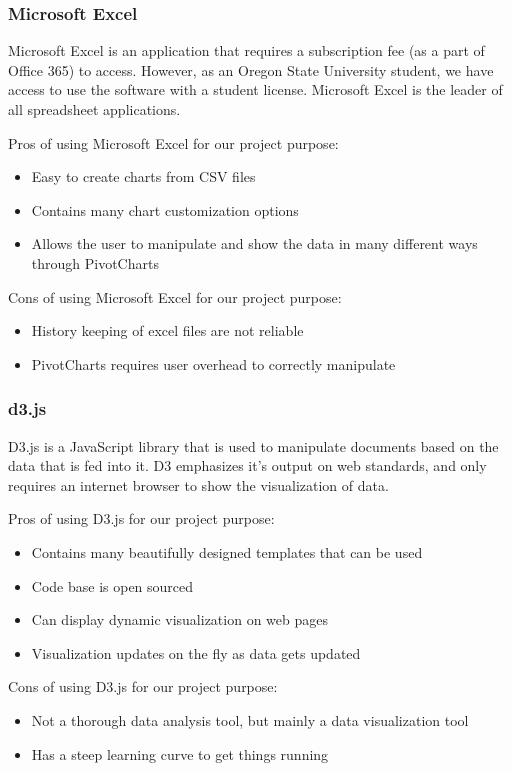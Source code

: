\documentclass[10pt,journal,compsoc,draftclsnofoot]{IEEEtran}
\begin{document}
\subsubsection{Microsoft Excel}
Microsoft Excel is an application that requires a subscription fee (as a part of Office 365) to access.
However, as an Oregon State University student, we have access to use the software with a student license.
Microsoft Excel is the leader of all spreadsheet applications.

Pros of using Microsoft Excel for our project purpose:
\begin{itemize}
\item Easy to create charts from CSV files
\item Contains many chart customization options
\item Allows the user to manipulate and show the data in many different ways through PivotCharts
\end{itemize}

Cons of using Microsoft Excel for our project purpose:
\begin{itemize}
\item History keeping of excel files are not reliable
\item PivotCharts requires user overhead to correctly manipulate
\end{itemize}

\subsubsection{d3.js}
D3.js is a JavaScript library that is used to manipulate documents based on the data that is fed into it.
D3 emphasizes it's output on web standards, and only requires an internet browser to show the visualization of data.

Pros of using D3.js for our project purpose:
\begin{itemize}
\item Contains many beautifully designed templates that can be used
\item Code base is open sourced
\item Can display dynamic visualization on web pages
\item Visualization updates on the fly as data gets updated
\end{itemize}

Cons of using D3.js for our project purpose:
\begin{itemize}
\item Not a thorough data analysis tool, but mainly a data visualization tool
\item Has a steep learning curve to get things running
\end{itemize}
\end{document}
